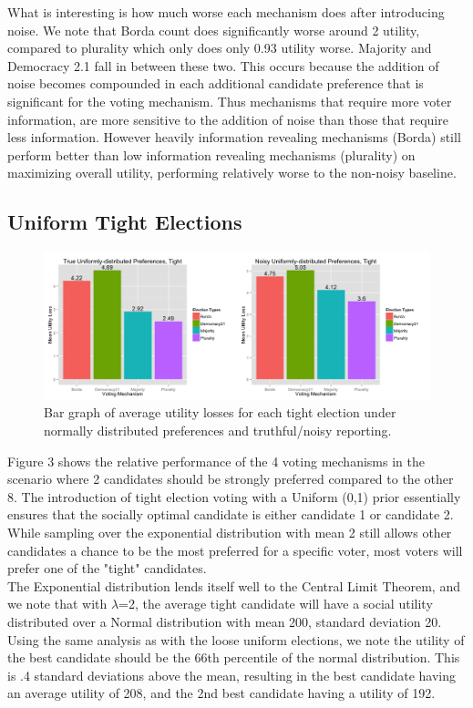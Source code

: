 \documentclass[11pt]{scrartcl}
\begin{document}
What is interesting is how much worse each mechanism does after introducing noise. We note that Borda count does significantly worse around 2 utility, compared to plurality which only does only 0.93 utility worse. Majority and Democracy 2.1 fall in between these two. This occurs because the addition of noise becomes compounded in each additional candidate preference that is significant for the voting mechanism. Thus mechanisms that require more voter information, are more sensitive to the addition of noise than those that require less information. However heavily information revealing mechanisms (Borda) still perform better than low information revealing mechanisms (plurality) on maximizing overall utility, performing relatively worse to the non-noisy baseline.

\subsection{Uniform Tight Elections}

\begin{figure}[H]\center
\includegraphics[scale=0.38]{uniform_tight_noisy.png}
\caption{Bar graph of average utility losses for each tight election under normally distributed preferences and truthful/noisy reporting.}
\end{figure}

Figure 3 shows the relative performance of the 4 voting mechanisms in the scenario where 2 candidates should be strongly preferred compared to the other 8. The introduction of tight election voting with a Uniform (0,1) prior essentially ensures that the socially optimal candidate is either candidate 1 or candidate 2. While sampling over the exponential distribution with mean 2 still allows other candidates a chance to be the most preferred for a specific voter, most voters will prefer one of the "tight" candidates.\\

The Exponential distribution lends itself well to the Central Limit Theorem, and we note that with $\lambda$=2, the average tight candidate will have a social utility distributed over a Normal distribution with mean 200, standard deviation 20. Using the same analysis as with the loose uniform elections, we note the utility of the best candidate should be the $66$th percentile of the normal distribution. This is .4 standard deviations above the mean, resulting in the best candidate having an average utility of 208, and the 2nd best candidate having a utility of 192.\\
\end{document}
